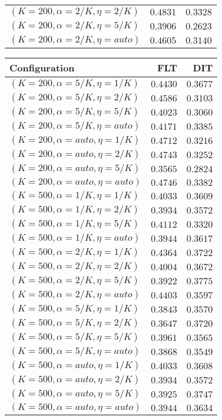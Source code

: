 \begin{table}
\begin{spacing}{1.2}
{\begin{tabular}{lrr}
   $(K=200,\alpha=2/K,\eta=2/K)$ & $\bm{0.4831}$ & $0.3328$ \\
   $(K=200,\alpha=2/K,\eta=5/K)$ &      $0.3906$ & $0.2623$ \\
  $(K=200,\alpha=2/K,\eta=auto)$ &      $0.4605$ & $0.3140$ \\
\bottomrule
\end{tabular}
} \hfill \parbox{.45\linewidth}{\centering \begin{tabular}{lrr}
\toprule
                   Configuration &      FLT &           DIT \\
\midrule
   $(K=200,\alpha=5/K,\eta=1/K)$ & $0.4430$ &      $0.3677$ \\
   $(K=200,\alpha=5/K,\eta=2/K)$ & $0.4586$ &      $0.3103$ \\
   $(K=200,\alpha=5/K,\eta=5/K)$ & $0.4023$ &      $0.3060$ \\
  $(K=200,\alpha=5/K,\eta=auto)$ & $0.4171$ &      $0.3385$ \\
  $(K=200,\alpha=auto,\eta=1/K)$ & $0.4712$ &      $0.3216$ \\
  $(K=200,\alpha=auto,\eta=2/K)$ & $0.4743$ &      $0.3252$ \\
  $(K=200,\alpha=auto,\eta=5/K)$ & $0.3565$ &      $0.2824$ \\
 $(K=200,\alpha=auto,\eta=auto)$ & $0.4746$ &      $0.3382$ \\
   $(K=500,\alpha=1/K,\eta=1/K)$ & $0.4033$ &      $0.3609$ \\
   $(K=500,\alpha=1/K,\eta=2/K)$ & $0.3934$ &      $0.3572$ \\
   $(K=500,\alpha=1/K,\eta=5/K)$ & $0.4112$ &      $0.3320$ \\
  $(K=500,\alpha=1/K,\eta=auto)$ & $0.3944$ &      $0.3617$ \\
   $(K=500,\alpha=2/K,\eta=1/K)$ & $0.4364$ &      $0.3722$ \\
   $(K=500,\alpha=2/K,\eta=2/K)$ & $0.4004$ &      $0.3672$ \\
   $(K=500,\alpha=2/K,\eta=5/K)$ & $0.3922$ & $\bm{0.3775}$ \\
  $(K=500,\alpha=2/K,\eta=auto)$ & $0.4403$ &      $0.3597$ \\
   $(K=500,\alpha=5/K,\eta=1/K)$ & $0.3843$ &      $0.3570$ \\
   $(K=500,\alpha=5/K,\eta=2/K)$ & $0.3647$ &      $0.3720$ \\
   $(K=500,\alpha=5/K,\eta=5/K)$ & $0.3961$ &      $0.3565$ \\
  $(K=500,\alpha=5/K,\eta=auto)$ & $0.3868$ &      $0.3549$ \\
  $(K=500,\alpha=auto,\eta=1/K)$ & $0.4033$ &      $0.3608$ \\
  $(K=500,\alpha=auto,\eta=2/K)$ & $0.3934$ &      $0.3572$ \\
  $(K=500,\alpha=auto,\eta=5/K)$ & $0.3925$ &      $0.3747$ \\
 $(K=500,\alpha=auto,\eta=auto)$ & $0.3944$ &      $0.3634$ \\
\bottomrule
\end{tabular}
}
\end{spacing}
\end{table}
